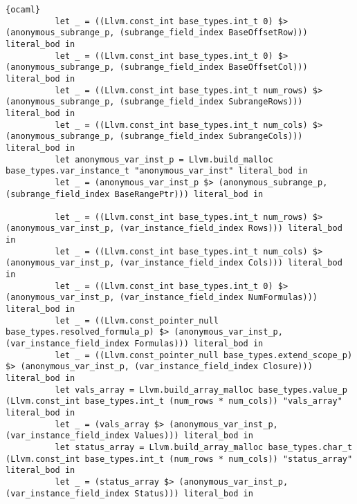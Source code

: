 \begin{lstlisting}{ocaml}
          let _ = ((Llvm.const_int base_types.int_t 0) $> (anonymous_subrange_p, (subrange_field_index BaseOffsetRow))) literal_bod in
          let _ = ((Llvm.const_int base_types.int_t 0) $> (anonymous_subrange_p, (subrange_field_index BaseOffsetCol))) literal_bod in
          let _ = ((Llvm.const_int base_types.int_t num_rows) $> (anonymous_subrange_p, (subrange_field_index SubrangeRows))) literal_bod in
          let _ = ((Llvm.const_int base_types.int_t num_cols) $> (anonymous_subrange_p, (subrange_field_index SubrangeCols))) literal_bod in
          let anonymous_var_inst_p = Llvm.build_malloc base_types.var_instance_t "anonymous_var_inst" literal_bod in
          let _ = (anonymous_var_inst_p $> (anonymous_subrange_p, (subrange_field_index BaseRangePtr))) literal_bod in

          let _ = ((Llvm.const_int base_types.int_t num_rows) $> (anonymous_var_inst_p, (var_instance_field_index Rows))) literal_bod in
          let _ = ((Llvm.const_int base_types.int_t num_cols) $> (anonymous_var_inst_p, (var_instance_field_index Cols))) literal_bod in
          let _ = ((Llvm.const_int base_types.int_t 0) $> (anonymous_var_inst_p, (var_instance_field_index NumFormulas))) literal_bod in
          let _ = ((Llvm.const_pointer_null base_types.resolved_formula_p) $> (anonymous_var_inst_p, (var_instance_field_index Formulas))) literal_bod in
          let _ = ((Llvm.const_pointer_null base_types.extend_scope_p) $> (anonymous_var_inst_p, (var_instance_field_index Closure))) literal_bod in
          let vals_array = Llvm.build_array_malloc base_types.value_p (Llvm.const_int base_types.int_t (num_rows * num_cols)) "vals_array" literal_bod in
          let _ = (vals_array $> (anonymous_var_inst_p, (var_instance_field_index Values))) literal_bod in
          let status_array = Llvm.build_array_malloc base_types.char_t (Llvm.const_int base_types.int_t (num_rows * num_cols)) "status_array" literal_bod in
          let _ = (status_array $> (anonymous_var_inst_p, (var_instance_field_index Status))) literal_bod in


\end{lstlisting}
